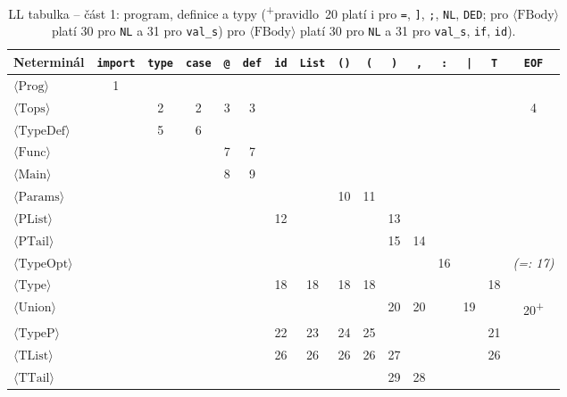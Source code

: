 \documentclass[11pt, a4paper]{article}
\renewcommand{\arraystretch}{1.15}%
\begin{document}
\begin{table}[H]
  \centering
  \footnotesize
  \renewcommand{\arraystretch}{1.22}
  \setlength{\tabcolsep}{3.2pt}
  \begin{tabular}{lccccccccccccccc}
    \toprule
    \textbf{Neterminál} & \texttt{import} & \texttt{type} & \texttt{case} & \texttt{@} & \texttt{def} & \texttt{id} & \texttt{List} & \texttt{()} & \texttt{(} & \texttt{)} & \texttt{,} & \texttt{:} & \texttt{|} & \texttt{T} & \texttt{EOF} \\
    \midrule
    $\langle\text{Prog}\rangle$    & 1 & & & & & & & & & & & & & & \\
    $\langle\text{Tops}\rangle$    & & 2 & 2 & 3 & 3 & & & & & & & & & & 4 \\
    $\langle\text{TypeDef}\rangle$ & & 5 & 6 & & & & & & & & & & & & \\
    $\langle\text{Func}\rangle$    & & & & 7 & 7 & & & & & & & & & & \\
    $\langle\text{Main}\rangle$    & & & & 8 & 9 & & & & & & & & & & \\
    $\langle\text{Params}\rangle$  & & & & & & & & 10 & 11 & & & & & & \\
    $\langle\text{PList}\rangle$   & & & & & & 12 & & & & 13 & & & & & \\
    $\langle\text{PTail}\rangle$   & & & & & & & & & & 15 & 14 & & & & \\
    $\langle\text{TypeOpt}\rangle$ & & & & & & & & & & & & 16 & & & \textit{(=: 17)} \\
    $\langle\text{Type}\rangle$    & & & & & & 18 & 18 & 18 & 18 & & & & & 18 & \\
    $\langle\text{Union}\rangle$   & & & & & & & & & & 20 & 20 & & 19 & & 20\textsuperscript{+} \\
    $\langle\text{TypeP}\rangle$   & & & & & & 22 & 23 & 24 & 25 & & & & & 21 & \\
    $\langle\text{TList}\rangle$   & & & & & & 26 & 26 & 26 & 26 & 27 & & & & 26 & \\
    $\langle\text{TTail}\rangle$   & & & & & & & & & & 29 & 28 & & & & \\
    \bottomrule
  \end{tabular}
  \caption{LL tabulka -- část 1: program, definice a typy (\textsuperscript{+}pravidlo~20 platí i pro \texttt{=}, \texttt{]}, \texttt{;}, \texttt{NL}, \texttt{DED}; pro $\langle\text{FBody}\rangle$ platí 30 pro \texttt{NL} a 31 pro \texttt{val\_s}) pro $\langle\text{FBody}\rangle$ platí 30 pro \texttt{NL} a 31 pro \texttt{val\_s}, \texttt{if}, \texttt{id}).}
  \label{tab:ll1}
\end{table}
\end{document}
